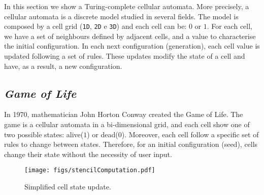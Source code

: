 \documentclass[12pt]{article}
\begin{document}
In this section we show a Turing-complete cellular automata. More precisely, a cellular automata is a discrete model studied in several fields. The model is composed by a cell grid (\texttt{1D}, \texttt{2D} e \texttt{3D}) and each cell can be: $0$ or $1$. For each cell, we have a set of neighbours defined by adjacent cells, and a value to characterise the initial configuration. In each next configuration (generation), each cell value is updated following a set of rules. These updates modify the state of a cell and have, as a result, a new configuration.


\subsection{\textit{Game of Life}}

In 1970, mathematician John Horton Conway created the Game of Life. The game is a cellular automata in a bi-dimensional grid, and each cell show one of two possible states: alive($1$) or dead($0$). Moreover, each cell follow a specific set of rules to change between states. Therefore, for an initial configuration (seed), cells change their state without the necessity of user input.


\begin{figure}[h]
    \centering
    \texttt{[image: figs/stencilComputation.pdf]}
    \caption{Simplified cell state update.}
    \label{fig:stencil}
\end{figure}
\end{document}
